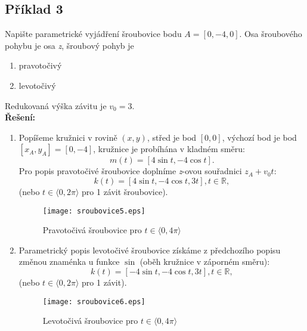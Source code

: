 \subsection*{Příklad 3}
Napište parametrické vyjádření šroubovice bodu $A=[0,-4,0]$. Osa šroubového pohybu je osa \textit{z},
šroubový pohyb je
\begin{enumerate}
	\item pravotočivý
	\item levotočivý
\end{enumerate}
Redukovaná výška závitu je $v_0=3$. \\[10pt]
\textbf{Řešení: } 
\begin{enumerate}
	\item Popíšeme kružnici v rovině $(x,y)$, střed je bod $[0,0]$, výchozí bod je bod $[x_A, y_A]=[0,-4]$, kružnice je probíhána v kladném směru:
	      $$m(t) = \left[4\sin{t}, -4\cos{t}\right].$$
	      Pro popis pravotočivé šroubovice doplníme \textit{z}-ovou souřadnici $z_A+v_0t$:
	      $$k(t) = \left[4\sin{t}, -4\cos{t}, 3t\right], t \in \mathbb{R},$$
	      (nebo $t \in \langle0, 2\pi\rangle$ pro 1 závit šroubovice).
	      \begin{figure}[H]
	      	\centering
	      	\texttt{[image: sroubovice5.eps]}
	      	\caption{Pravotočivá šroubovice pro $t \in \langle0, 4\pi\rangle$}
	      	
	      \end{figure}	 	
	      \clearpage
	\item Parametrický popis levotočivé šroubovice získáme z předchozího popisu změnou znaménka u funkce $\sin$ (oběh kružnice v záporném směru):
	      $$k(t) = \left[-4\sin{t}, -4\cos{t}, 3t\right], t \in \mathbb{R},$$
	      (nebo $t \in \langle0, 2\pi\rangle$ pro 1 závit). 	
	      \begin{figure}[H]
	      	\centering
	      	\texttt{[image: sroubovice6.eps]}
	      	\caption{Levotočivá šroubovice pro $t \in \langle0, 4\pi\rangle$}
	      	
	      \end{figure}	 	
\end{enumerate}
\clearpage
